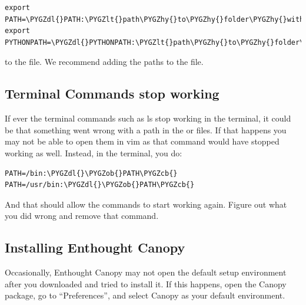 \documentclass[letterpaper,10pt,english]{sphinxmanual}
\def\PYGZob{\char`\{}
\def\PYGZcb{\char`\}}
\def\PYGZlt{\char`\<}
\def\PYGZgt{\char`\>}
\def\PYGZdl{\char`\$}
\def\PYGZhy{\char`\-}
\begin{document}
\begin{Verbatim}[commandchars=\\\{\}]
export PATH=\PYGZdl{}PATH:\PYGZlt{}path\PYGZhy{}to\PYGZhy{}folder\PYGZhy{}with\PYGZhy{}scripts\PYGZgt{}
export PYTHONPATH=\PYGZdl{}PYTHONPATH:\PYGZlt{}path\PYGZhy{}to\PYGZhy{}folder\PYGZhy{}with\PYGZhy{}scripts\PYGZgt{}
\end{Verbatim}

to the  file. We recommend adding the paths to the  file.


\subsection{Terminal Commands stop working}
\label{docfiles/install_dependencies:terminal-commands-stop-working}
If ever the terminal commands such as ls stop working in the terminal, it could be that something went wrong with a path in the  or  files. If that happens you may not be able to open them in vim as that command would have stopped working as well. Instead, in the terminal, you do:

\begin{Verbatim}[commandchars=\\\{\}]
PATH=/bin:\PYGZdl{}\PYGZob{}PATH\PYGZcb{}
PATH=/usr/bin:\PYGZdl{}\PYGZob{}PATH\PYGZcb{}
\end{Verbatim}

And that should allow the commands to start working again. Figure out what you did wrong and remove that command.


\subsection{Installing Enthought Canopy}
\label{docfiles/install_dependencies:installing-enthought-canopy}
Occasionally, Enthought Canopy may not open the default setup environment after you downloaded and tried to install it. If this happens, open the Canopy package, go to ``Preferences'', and select Canopy as your default environment.
\end{document}
